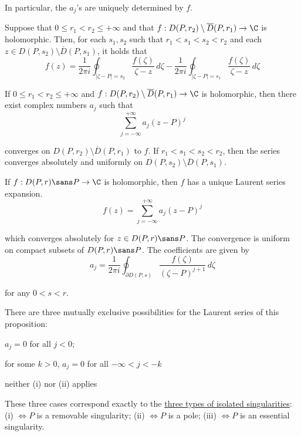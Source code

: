In particular, the $a_j$'s are uniquely determined by $f$.

\label{ca5d89e}

Suppose that $0\leq r_1<r_2\leq+\infty$ and that $f:D(P,r_2)\setminus\overline
D(P,r_1)\to\C$ is holomorphic. Then, for each $s_1,s_2$ such that
$r_1<s_1<s_2<r_2$ and each $z\in D(P,s_2)\setminus\overline D(P,s_1)$, it holds
that
$$
  f(z)=\frac1{2\pi i}\oint_{|\zeta-P|=s_2}\frac{f(\zeta)}{\zeta-z}\,d\zeta
  -\frac1{2\pi i}\oint_{|\zeta-P|=s_1}\frac{f(\zeta)}{\zeta-z}\,d\zeta
$$

\label{cd93e84}

If $0\leq r_1<r_2\leq+\infty$ and $f:D(P,r_2)\setminus\overline D(P,r_1)\to\C$
is holomorphic, then there exist complex numbers $a_j$ such that
$$
  \sum_{j=-\infty}^{+\infty}a_j(z-P)^j
$$

converges on $D(P,r_2)\setminus\overline D(P,r_1)$ to $f$. If
$r_1<s_1<s_2<r_2$, then the series converges absolutely and uniformly on
$D(P,s_2)\setminus\overline D(P,s_1)$.

\label{e7fa5f8}

If $f:D(P,r)\sans P\to\C$ is holomorphic, then $f$ has a unique Laurent series
expansion.
$$
  f(z)=\sum_{j=-\infty}^{+\infty}a_j(z-P)^j
$$

which converges absolutely for $z\in D(P,r)\sans P$. The convergence is uniform
on compact subsets of $D(P,r)\sans P$. The coefficients are given by
$$
  a_j=\frac1{2\pi i}\oint_{\partial D(P,s)}\frac{f(\zeta)}{(\zeta-P)^{j+1}}\,d\zeta
$$

for any $0<s<r$.

There are three mutually exclusive possibilities for the Laurent series of this
proposition:
\begin{enumerati}
  \item $a_j=0$ for all $j<0$;
  \item for some $k>0$, $a_j=0$ for all $-\infty<j<-k$
  \item neither (i) nor (ii) applies
\end{enumerati}

These three cases correspond exactly to the \href{a7f062e}{three types of
isolated singularities}: (i) $\iff P$ is a removable singularity; (ii) $\iff P$
is a pole; (iii) $\iff P$ is an essential singularity.

\label{c1d2d0c}

